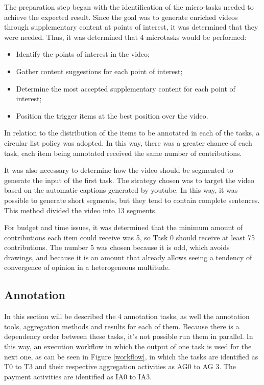 The preparation step began with the identification of the micro-tasks needed to achieve the expected result. Since the goal was to generate enriched videos through supplementary content at points of interest, it was determined that they were needed. Thus, it was determined that 4 microtasks would be performed:

\begin{itemize}
\item Identify the points of interest in the video; 
\item Gather content suggestions for each point of interest; 
\item Determine the most accepted supplementary content for each point of interest; 
\item Position the trigger items at the best position over the video. 
\end{itemize}

In relation to the distribution of the items to be annotated in each of the tasks, a circular list policy was adopted. In this way, there was a greater chance of each task, each item being annotated received the same number of contributions.

It was also necessary to determine how the video should be segmented to generate the input of the first task. The strategy chosen was to target the video based on the automatic captions generated by youtube. In this way, it was possible to generate short segments, but they tend to contain complete sentences. This method divided the video into 13 segments.

For budget and time issues, it was determined that the minimum amount of contributions each item could receive was 5, so Task 0 should receive at least 75 contributions. The number 5 was chosen because it is odd, which avoids drawings, and because it is an amount that already allows seeing a tendency of convergence of opinion in a heterogeneous multitude.

\subsection{Annotation}
In this section will be described the 4 annotation tasks, as well the annotation tools, aggregation methods and results for each of them. Because there is a dependency order between these tasks, it's not possible run them in parallel. In this way, an execution workflow in which the output of one task is used for the next one, as can be seen in Figure \ref{workflow}, in which the tasks are identified as T0 to T3 and their respective aggregation activities as AG0 to AG 3. The payment activities are identified as IA0 to IA3.

